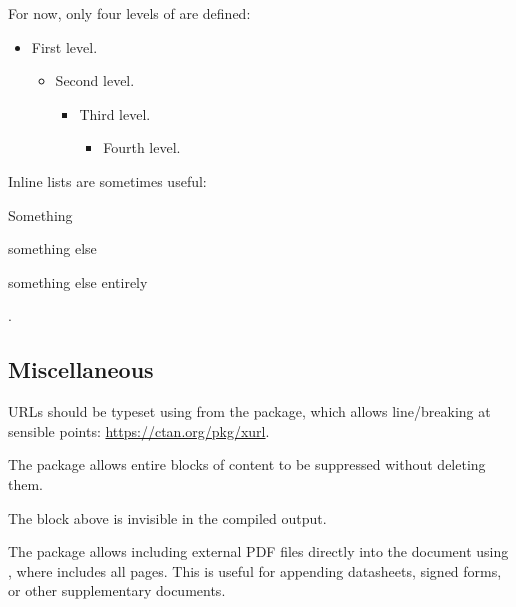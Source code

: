 For now, only four levels of  are defined:

\begin{itemize}
  \item First level.
  \begin{itemize}
    \item Second level.
    \begin{itemize}
      \item Third level.
      \begin{itemize}
        \item Fourth level.
      \end{itemize}
    \end{itemize}
  \end{itemize}
\end{itemize}

Inline lists are sometimes useful: \begin{enumerate*}
  \item Something
  \item something else
  \item something else entirely
\end{enumerate*}.

\subsection{Miscellaneous}

URLs should be typeset using \latexinline{\url{}} from the  package, which allows line\-/breaking at sensible points: \url{https://ctan.org/pkg/xurl}.

The  package allows entire blocks of content to be suppressed without deleting them.

The block above is invisible in the compiled output.

The  package allows including external PDF files directly into the document using \latexinline{}, where  includes all pages. This is useful for appending datasheets, signed forms, or other supplementary documents.
